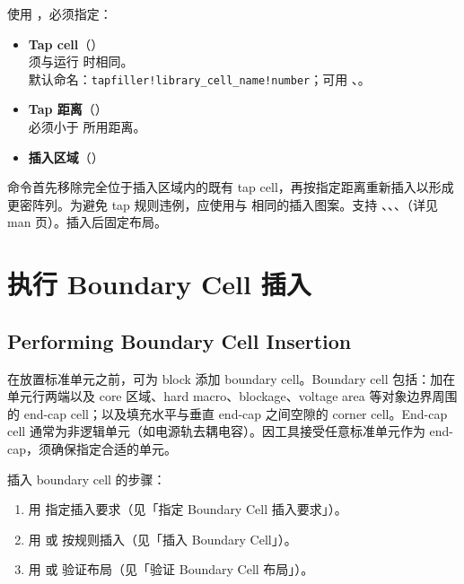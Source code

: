 使用 ，必须指定：
\begin{itemize}
  \item \textbf{Tap cell}（）\\
        须与运行  时相同。\\
        默认命名：\texttt{tapfiller!library\_cell\_name!number}；可用 、。
  \item \textbf{Tap 距离}（）\\
        必须小于  所用距离。
  \item \textbf{插入区域}（）
\end{itemize}

命令首先移除完全位于插入区域内的既有 tap cell，再按指定距离重新插入以形成更密阵列。为避免 tap 规则违例，应使用与  相同的插入图案。支持 、、、（详见 man 页）。插入后固定布局。

\section{执行 Boundary Cell 插入}
\subsection*{Performing Boundary Cell Insertion}

在放置标准单元之前，可为 block 添加 boundary cell。Boundary cell 包括：加在单元行两端以及 core 区域、hard macro、blockage、voltage area 等对象边界周围的 end-cap cell；以及填充水平与垂直 end-cap 之间空隙的 corner cell。End-cap cell 通常为非逻辑单元（如电源轨去耦电容）。因工具接受任意标准单元作为 end-cap，须确保指定合适的单元。

插入 boundary cell 的步骤：
\begin{enumerate}
  \item 用  指定插入要求（见「指定 Boundary Cell 插入要求」）。
  \item 用  或  按规则插入（见「插入 Boundary Cell」）。
  \item 用  或  验证布局（见「验证 Boundary Cell 布局」）。
\end{enumerate}

